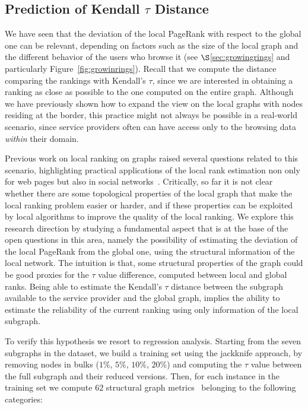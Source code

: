 \documentclass{sig-alternate-2013}
\newcommand{\ie}{\emph{i.e.}}
\begin{document}
\subsection{Prediction of Kendall $\tau$ Distance} \label{sec:deltaprediction}
We have seen that the deviation of the local PageRank %
with respect to the global one can be relevant, depending on
factors such as the size of the local graph and the different behavior of the
users who browse it (see $\S$\ref{sec:growingrings} and particularly
Figure~\ref{fig:growinrings}). Recall that we compute the distance comparing the rankings with Kendall's $\tau$, since we are interested in obtaining a ranking as close as possible to the one computed on the entire graph.
Although we have previously shown how to expand the view on the local graphs with nodes residing at the border, this practice might not always be possible in a real-world scenario, since service providers often can have access only to the browsing data \emph{within} their domain.

Previous work on local ranking on graphs raised several questions related to
this scenario, highlighting practical applications of the local rank estimation
non only for web pages but also in social networks~\cite{Bressan2011}.
Critically, so far it is not clear whether there are some topological properties
of the local graph that make the local ranking problem easier or harder, and if
these properties can be exploited by local algorithms to improve the quality of
the local ranking. We explore this research direction by studying a fundamental
aspect that is at the base of the open questions in this area, namely the
possibility of estimating the deviation of the local PageRank from the global
one, using the structural information of the local network. The intuition is that,
some structural properties of the graph could be good proxies for the $\tau$
value difference, computed between local and global ranks.
Being able to estimate the Kendall's $\tau$ distance between the subgraph available to the service provider and the global graph, implies the ability to estimate the reliability of the current ranking using only information of the local subgraph.

To verify this hypothesis we resort to regression analysis. Starting from the
seven subgraphs in the dataset, we build a training set using the jackknife
approach, by removing nodes in bulks ($1\%$, $5\%$, $10\%$, $20\%$) and
computing the $\tau$ value between the full subgraph and their reduced versions.
Then, for each instance in the training set we compute $62$ structural graph
metrics~\cite{wasserman94social,Barrat2008} belonging to the following
categories:
\end{document}
